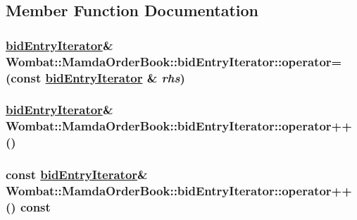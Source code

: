 \subsection{Member Function Documentation}
\hypertarget{classWombat_1_1MamdaOrderBook_1_1bidEntryIterator_f51d6828a8018c1496dafe281aed6262}{
\subsubsection[operator=]{\setlength{\rightskip}{0pt plus 5cm}\hyperlink{classWombat_1_1MamdaOrderBook_1_1bidEntryIterator}{bid\-Entry\-Iterator}\& Wombat::Mamda\-Order\-Book::bid\-Entry\-Iterator::operator= (const \hyperlink{classWombat_1_1MamdaOrderBook_1_1bidEntryIterator}{bid\-Entry\-Iterator} \& {\em rhs})}}
\label{classWombat_1_1MamdaOrderBook_1_1bidEntryIterator_f51d6828a8018c1496dafe281aed6262}


\hypertarget{classWombat_1_1MamdaOrderBook_1_1bidEntryIterator_bd87703898da018539772ee01339c570}{
\subsubsection[operator++]{\setlength{\rightskip}{0pt plus 5cm}\hyperlink{classWombat_1_1MamdaOrderBook_1_1bidEntryIterator}{bid\-Entry\-Iterator}\& Wombat::Mamda\-Order\-Book::bid\-Entry\-Iterator::operator++ ()}}
\label{classWombat_1_1MamdaOrderBook_1_1bidEntryIterator_bd87703898da018539772ee01339c570}


\hypertarget{classWombat_1_1MamdaOrderBook_1_1bidEntryIterator_3f0899f5af11f1c9e3f9bd8555c583da}{
\subsubsection[operator++]{\setlength{\rightskip}{0pt plus 5cm}const \hyperlink{classWombat_1_1MamdaOrderBook_1_1bidEntryIterator}{bid\-Entry\-Iterator}\& Wombat::Mamda\-Order\-Book::bid\-Entry\-Iterator::operator++ () const}}
\label{classWombat_1_1MamdaOrderBook_1_1bidEntryIterator_3f0899f5af11f1c9e3f9bd8555c583da}


